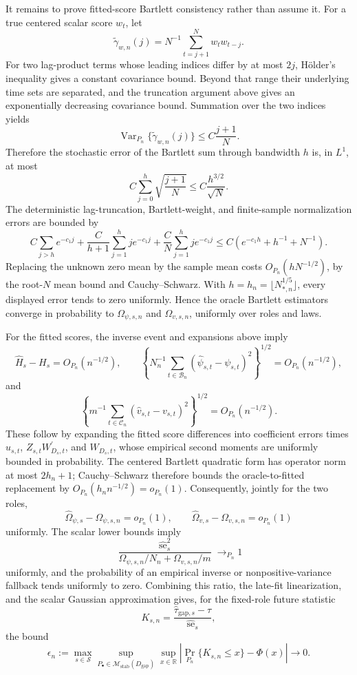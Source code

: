 It remains to prove fitted-score Bartlett consistency rather than assume it.  For a true centered scalar score \(w_t\), let
\[
 \widetilde\gamma_{w,n}(j)=N^{-1}\sum_{t=j+1}^Nw_tw_{t-j}.
\]
For two lag-product terms whose leading indices differ by at most \(2j\), H\"older's inequality gives a constant covariance bound.  Beyond that range their underlying time sets are separated, and the truncation argument above gives an exponentially decreasing covariance bound.  Summation over the two indices yields
\[
 \operatorname{Var}_{P_n}\{\widetilde\gamma_{w,n}(j)\}
 \leq C\frac{j+1}{N}.
\]
Therefore the stochastic error of the Bartlett sum through bandwidth \(h\) is, in \(L^1\), at most
\[
 C\sum_{j=0}^h\sqrt{\frac{j+1}{N}}
 \leq C\frac{h^{3/2}}{\sqrt N}.
\]
The deterministic lag-truncation, Bartlett-weight, and finite-sample normalization errors are bounded by
\[
 C\sum_{j>h}e^{-c_1j}
 +\frac C{h+1}\sum_{j=1}^hj e^{-c_1j}
 +\frac CN\sum_{j=1}^hj e^{-c_1j}
 \leq C(e^{-c_1h}+h^{-1}+N^{-1}).
\]
Replacing the unknown zero mean by the sample mean costs \(O_{P_n}(hN^{-1/2})\), by the root-\(N\) mean bound and Cauchy--Schwarz.  With \(h=h_n=\lfloor N_{*,n}^{1/5}\rfloor\), every displayed error tends to zero uniformly.  Hence the oracle Bartlett estimators converge in probability to \(\Omega_{\psi,s,n}\) and \(\Omega_{v,s,n}\), uniformly over roles and laws.

For the fitted scores, the inverse event and expansions above imply
\[
 \widehat H_s-H_s=O_{P_n}(n^{-1/2}),
 \qquad
 \left\{N_n^{-1}\sum_{t\in\mathcal B_n}
  (\widehat\psi_{s,t}-\psi_{s,t})^2\right\}^{1/2}
 =O_{P_n}(n^{-1/2}),
\]
and
\[
 \left\{m^{-1}\sum_{t\in\mathcal C_n}
  (\widehat v_{s,t}-v_{s,t})^2\right\}^{1/2}
 =O_{P_n}(n^{-1/2}).
\]
These follow by expanding the fitted score differences into coefficient errors times \(u_{s,t}\), \(Z_{s,t}W_{D_s,t}^{\prime}\), and \(W_{D_s,t}\), whose empirical second moments are uniformly bounded in probability.  The centered Bartlett quadratic form has operator norm at most \(2h_n+1\); Cauchy--Schwarz therefore bounds the oracle-to-fitted replacement by \(O_{P_n}(h_nn^{-1/2})=o_{P_n}(1)\).  Consequently, jointly for the two roles,
\[
 \widehat\Omega_{\psi,s}-\Omega_{\psi,s,n}=o_{P_n}(1),
 \qquad
 \widehat\Omega_{v,s}-\Omega_{v,s,n}=o_{P_n}(1)
\]
uniformly.  The scalar lower bounds imply
\[
 \frac{
  \widehat{\operatorname{se}}_s^2
 }{
  \Omega_{\psi,s,n}/N_n+\Omega_{v,s,n}/m
 }\to_{P_n}1
\]
uniformly, and the probability of an empirical inverse or nonpositive-variance fallback tends uniformly to zero.  Combining this ratio, the late-fit linearization, and the scalar Gaussian approximation gives, for the fixed-role future statistic
\[
 K_{s,n}=\frac{\widehat\tau_{\mathrm{gap},s}-\tau}
 {\widehat{\operatorname{se}}_s},
\]
the bound
\[
 \epsilon_n:=
 \max_{s\in\mathcal S}
 \sup_{P_\bullet\in\mathcal M_{\mathrm{stab}}(D_{\mathrm{gap}})}
 \sup_{x\in\mathbb R}
 |\Pr_{P_n}\{K_{s,n}\leq x\}-\Phi(x)|\longrightarrow0.
\]

